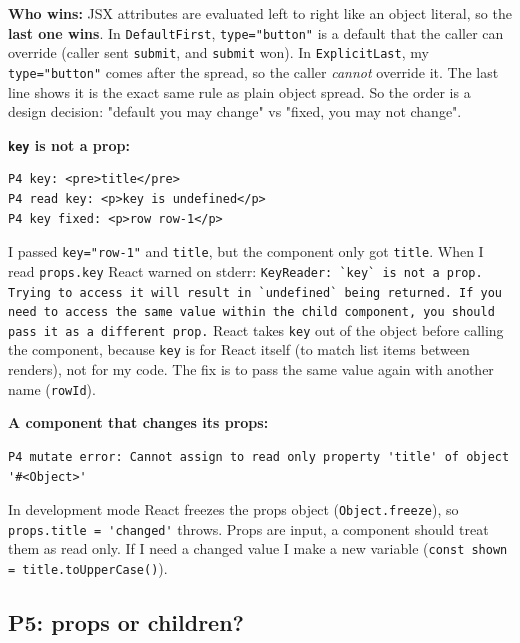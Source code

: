 \textbf{Who wins:} JSX attributes are evaluated left to right like an object literal, so the \textbf{last one wins}. In \passthrough{\lstinline!DefaultFirst!}, \passthrough{\lstinline!type="button"!} is a default that the caller can override (caller sent \passthrough{\lstinline!submit!}, and \passthrough{\lstinline!submit!} won). In \passthrough{\lstinline!ExplicitLast!}, my \passthrough{\lstinline!type="button"!} comes after the spread, so the caller \emph{cannot} override it. The last line shows it is the exact same rule as plain object spread. So the order is a design decision: "default you may change" vs "fixed, you may not change".

\textbf{\passthrough{\lstinline!key!} is not a prop:}

\begin{lstlisting}
P4 key: <pre>title</pre>
P4 read key: <p>key is undefined</p>
P4 key fixed: <p>row row-1</p>
\end{lstlisting}

I passed \passthrough{\lstinline!key="row-1"!} and \passthrough{\lstinline!title!}, but the component only got \passthrough{\lstinline!title!}. When I read \passthrough{\lstinline!props.key!} React warned on stderr: \passthrough{\lstinline!KeyReader: `key` is not a prop. Trying to access it will result in `undefined` being returned. If you need to access the same value within the child component, you should pass it as a different prop.!} React takes \passthrough{\lstinline!key!} out of the object before calling the component, because \passthrough{\lstinline!key!} is for React itself (to match list items between renders), not for my code. The fix is to pass the same value again with another name (\passthrough{\lstinline!rowId!}).

\textbf{A component that changes its props:}

\begin{lstlisting}
P4 mutate error: Cannot assign to read only property 'title' of object '#<Object>'
\end{lstlisting}

In development mode React freezes the props object (\passthrough{\lstinline!Object.freeze!}), so \passthrough{\lstinline!props.title = 'changed'!} throws. Props are input, a component should treat them as read only. If I need a changed value I make a new variable (\passthrough{\lstinline!const shown = title.toUpperCase()!}).

\hypertarget{p5-props-or-children}{%
\subsection{P5: props or children?}\label{p5-props-or-children}}

